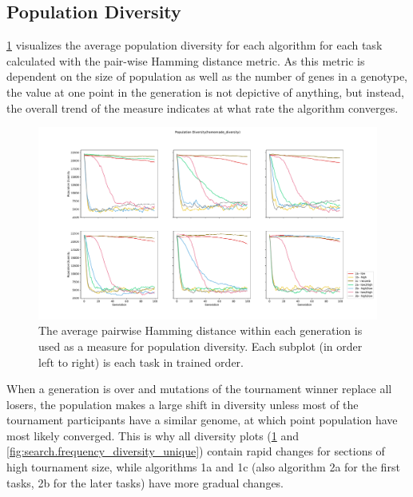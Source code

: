 \subsection{Population Diversity}
\ref{fig:search.hamming_diversity} visualizes the average population diversity for each algorithm for each task calculated with the pair-wise Hamming distance metric. As this metric is dependent on the size of population as well as the number of genes in a genotype, the value at one point in the generation is not depictive of anything, but instead, the overall trend of the measure indicates at what rate the algorithm converges. 

\begin{figure}[p!]
    \includegraphics[width=1.2\textwidth,center]{Chapters/4.Experiments/exp2/figures/Average_population_diversity_reduced_hamming.pdf}
    \caption{The average pairwise Hamming distance within each generation is used as a measure for population diversity. Each subplot (in order left to right) is each task in trained order.}
    \label{fig:search.hamming_diversity}
\end{figure}

When a generation is over and mutations of the tournament winner replace all losers, the population makes a large shift in diversity unless most of the tournament participants have a similar genome, at which point population have most likely converged. This is why all diversity plots (\ref{fig:search.hamming_diversity} and \ref{fig:search.frequency_diversity_unique}) contain rapid changes for sections of high tournament size, while algorithms 1a and 1c (also algorithm 2a for the first tasks, 2b for the later tasks) have more gradual changes. 

